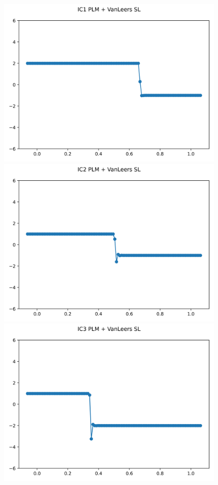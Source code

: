 \documentclass{article}
\begin{document}
\begin{figure}[t]
    \emp
        \centering
        \includegraphics[width=.95\textwidth]{../../code/hires_IC1Methodpv_plot.png}
        \includegraphics[width=.95\textwidth]{../../code/hires_IC2Methodpv_plot.png}
        \includegraphics[width=.95\textwidth]{../../code/hires_IC3Methodpv_plot.png}

\end{figure}
\end{document}
